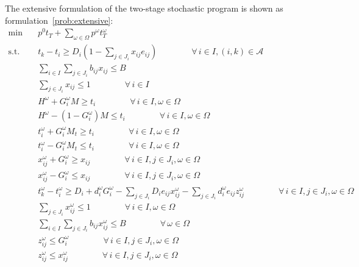 \documentclass[11pt]{article}
\newcommand{\noi}{\noindent}
\begin{document}
	\noi The extensive formulation of the two-stage stochastic program is shown as formulation~\eqref{prob:extensive}:
	\begin{subequations} \label{prob:extensive}
		\begin{align}
		\min \quad & p^0 t_T + \sum_{\omega \in \Omega} p^\omega t_T^\omega \\
		\text{s.t.} \quad & t_k - t_i \geq D_{i}(1 - \sum_{j \in J_i} x_{ij} e_{ij}) \qquad \qquad \forall \,i \in I, (i,k) \in \mathcal{A} \label{cons:Sep}\\
		& \sum_{i \in I} \sum_{j \in J_i} b_{ij}x_{ij} \leq B  \label{cons:Budget}\\
		& \sum_{j \in J_i} x_{ij} \leq 1  \qquad \qquad \forall \,i \in I \label{cons:SingleBudget}\\
		& H^\omega + G_i^\omega M \geq t_i \qquad \qquad \forall \,i \in I, \omega \in \Omega \label{cons:G1}\\
		& H^\omega - (1 - G_i^\omega) M \leq t_i \qquad \qquad \forall \,i \in I, \omega \in \Omega \label{cons:G2}\\
		& t_i^\omega + G_i^\omega M_t \geq t_i \qquad \qquad \forall \,i \in I, \omega \in \Omega \label{cons:tG1}\\
		& t_i^\omega - G_i^\omega M_t \leq t_i \qquad \qquad \forall \,i \in I, \omega \in \Omega \label{cons:tG2}\\
		& x_{ij}^\omega + G_i^\omega \geq x_{ij} \qquad \qquad \forall \,i \in I, j \in J_i, \omega \in \Omega \label{cons:xG1}\\
		& x_{ij}^\omega - G_i^\omega \leq x_{ij} \qquad \qquad \forall \,i \in I, j \in J_i, \omega \in \Omega \label{cons:xG2}\\
		& t_k^\omega - t_i^\omega \geq D_i + d_i^\omega G_i^\omega -\sum_{j \in J_i} D_i e_{ij} x_{ij}^\omega - \sum_{j \in J_i} d_i^\omega e_{ij} z_{ij}^\omega \qquad \qquad \forall \,i \in I, j \in J_i, \omega \in \Omega \label{cons:scenSep}\\
		& \sum_{j \in J_i} x_{ij}^\omega \leq 1 \qquad \qquad \forall \,i \in I, \omega \in \Omega \label{cons:scenBudget1}\\
		& \sum_{i \in I}\sum_{j \in J_i} b_{ij}x_{ij}^\omega \leq B \qquad \qquad \forall \,\omega \in \Omega \label{cons:scenBudget}\\
		& z_{ij}^\omega \leq G_i^\omega \qquad \qquad \forall \,i \in I, j \in J_i, \omega \in \Omega \label{cons:linearize1}\\
		& z_{ij}^\omega \leq x_{ij}^\omega \qquad \qquad \forall \,i \in I, j \in J_i, \omega \in \Omega \label{cons:linearize2}\\

\end{align}
\end{subequations}
\end{document}
